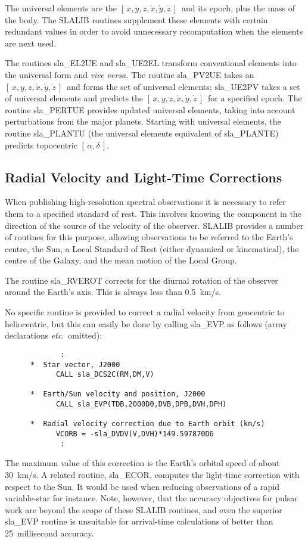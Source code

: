 \documentclass[11pt,twoside]{article}
\newcommand{\radec}     {$[\,\alpha,\delta\,]$}
\newcommand{\xyzxyzd}   {$[\,x,y,z,\dot{x},\dot{y},\dot{z}\,]$}
\begin{document}
The universal elements are the \xyzxyzd\ and its epoch, plus the mass
of the body.  The SLALIB routines supplement these elements with
certain redundant values in order to
avoid unnecessary recomputation when the elements are next used.

The routines
sla\_EL2UE and
sla\_UE2EL transform conventional elements into the
universal form and {\it vice versa.}
The routine
sla\_PV2UE takes an \xyzxyzd\ and forms the set of universal
elements;
sla\_UE2PV takes a set of universal elements and predicts the \xyzxyzd\
for a specified epoch.
The routine
sla\_PERTUE provides updated universal elements,
taking into account perturbations from the major planets.
Starting with universal elements, the routine
sla\_PLANTU (the universal elements equivalent of
sla\_PLANTE) predicts topocentric \radec.

\subsection{Radial Velocity and Light-Time Corrections}
When publishing high-resolution spectral observations
it is necessary to refer them to a specified standard of rest.
This involves knowing the component in the direction of the
source of the velocity of the observer.  SLALIB provides a number
of routines for this purpose, allowing observations to be
referred to the Earth's centre, the Sun, a Local Standard of Rest
(either dynamical or kinematical), the centre of the Galaxy, and
the mean motion of the Local Group.

The routine
sla\_RVEROT
corrects for the diurnal rotation of
the observer around the Earth's axis.  This is always less than 0.5~km/s.

No specific routine is provided to correct a radial velocity
from geocentric to heliocentric, but this can easily be done by calling
sla\_EVP
as follows (array declarations {\it etc}.\ omitted):
\goodbreak
\begin{verbatim}
             :
      *  Star vector, J2000
            CALL sla_DCS2C(RM,DM,V)

      *  Earth/Sun velocity and position, J2000
            CALL sla_EVP(TDB,2000D0,DVB,DPB,DVH,DPH)

      *  Radial velocity correction due to Earth orbit (km/s)
            VCORB = -sla_DVDV(V,DVH)*149.597870D6
             :
\end{verbatim}
\goodbreak
The maximum value of this correction is the Earth's orbital speed
of about 30~km/s.  A related routine,
sla\_ECOR,
computes the light-time correction with respect to the Sun.  It
would be used when reducing observations of a rapid variable-star
for instance.
Note, however, that the accuracy objectives for pulsar work are
beyond the scope of these SLALIB routines, and even the superior
sla\_EVP
routine is unsuitable for arrival-time calculations of better
than 25~millisecond accuracy.
\end{document}
